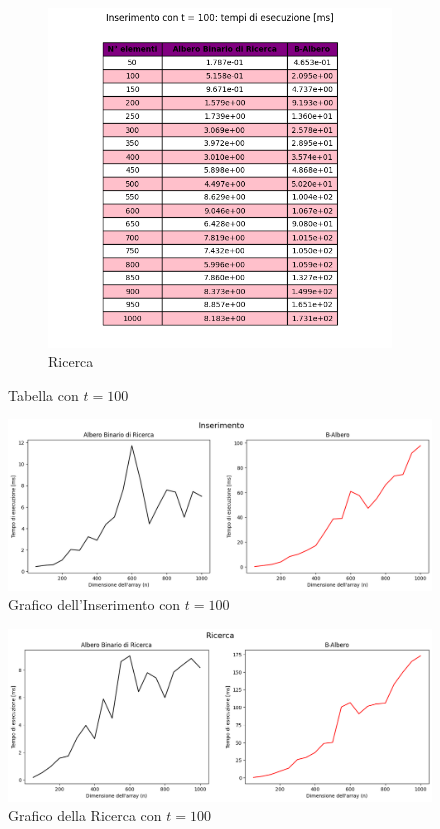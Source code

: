 \begin{figure}[H]
\begin{subfigure}[b]{0.49\textwidth}
        \includegraphics[width=\textwidth]{tables/search-ms-t100.png}
        \caption{Ricerca}
        \label{fig:tablesearchtimet100}
    \end{subfigure}
    \caption{Tabella con $t=100$}
    \label{fig:tabletimest100}
\end{figure}

\begin{figure}[H]
    \centering
    \includegraphics[width=\textwidth]{side-graphs/insert-ms-t100.png}
    \caption{Grafico dell'Inserimento con $t=100$}
        \label{fig:sidegraphinserttimet100}
\end{figure}
    
\begin{figure}[H]
    \centering
    \includegraphics[width=\textwidth]{side-graphs/search-ms-t100.png}
    \caption{Grafico della Ricerca con $t=100$}    \label{fig:sidegraphsearchtimet100}
\end{figure}

